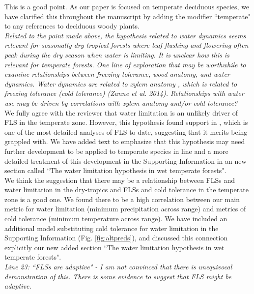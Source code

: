 \documentclass{article}[11pt]
\begin{document}
\noindent This is a good point. As our paper is focused on temperate deciduous species, we have clarified this throughout the manuscript by adding the modifier ``temperate" to any references to deciduous woody plants.\\

\emph{Related to the point made above, the hypothesis related to water dynamics seems relevant for seasonally dry tropical forests where leaf flushing and flowering often peak during the dry season when water is limiting. It is unclear how this is relevant for temperate forests. One line of exploration that may be worthwhile to examine relationships between freezing tolerance, wood anatomy, and water dynamics. Water dynamics are related to xylem anatomy , which is related to freezing tolerance (cold tolerance) (Zanne et al. 2014). Relationships with water use may be driven by correlations with xylem anatomy and/or cold tolerance?}\\

\noindent We fully agree with the reviewer that water limitation is an unlikely driver of FLS in the temperate zone. However, this hypothesis found support in \citet{Gougherty2018}, which is one of the most detailed analyses of FLS to date, suggesting that it merits being grappled with. We have added text to emphasize that this hypothesis may need further development to be applied to temperate species in line  and a more detailed treatment of this development in the Supporting Information in an new section called ``The water limitation hypothesis in wet temperate forests".\\

\noident We think the suggestion that there may be a relationship between FLSs and water limitation in the dry-tropics and FLSs and cold tolerance in the temperate zone is a good one. We found there to be a high correlation between our main metric for water limitation (minimum precipitation across range) and metrics of cold tolerance (minimum temperature across range). We have included an additional model substituting cold tolerance for water limitation in the Supporting Information (Fig. \ref{fig:altpreds}), and discussed this connection explicitly our new added section  ``The water limitation hypothesis in wet temperate forests".\\

\emph{Line 23: ``FLSs are adaptive" - I am not convinced that there is unequivocal demonstration of this. There is some evidence to suggest that FLS might be adaptive.}\\
\end{document}

